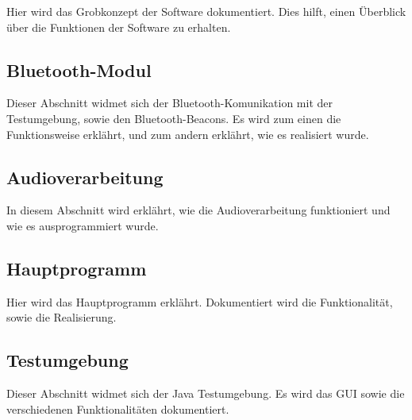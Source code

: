 Hier wird das Grobkonzept der Software dokumentiert. Dies hilft, einen Überblick über die Funktionen der Software zu erhalten.

\subsection{Bluetooth-Modul}
Dieser Abschnitt widmet sich der Bluetooth-Komunikation mit der Testumgebung, sowie den Bluetooth-Beacons. Es wird zum einen die Funktionsweise erklährt, und zum andern erklährt, wie es realisiert wurde.

\subsection{Audioverarbeitung}
In diesem Abschnitt wird erklährt, wie die Audioverarbeitung funktioniert und wie es ausprogrammiert wurde.

\subsection{Hauptprogramm}
Hier wird das Hauptprogramm erklährt. Dokumentiert wird die Funktionalität, sowie die Realisierung.

\subsection{Testumgebung}
Dieser Abschnitt widmet sich der Java Testumgebung. Es wird das GUI sowie die verschiedenen Funktionalitäten dokumentiert.
